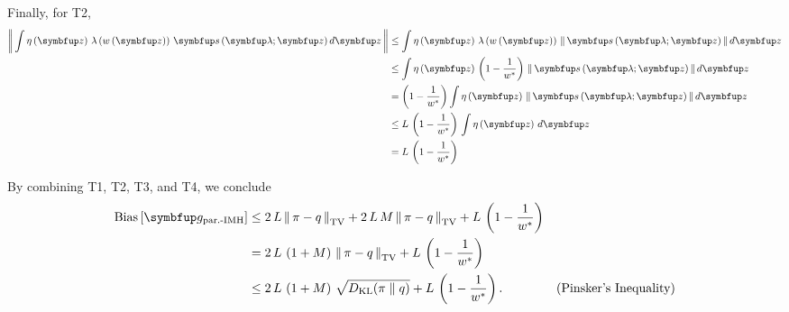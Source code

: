 \begin{proofEnd}
  Finally, for T2,
  \begin{align}
    \norm{
      \int \eta\left(\vz\right) \,
      \lambda\left(w\left(\vz\right)\right) \, \vs\left(\vlambda;\vz\right)
      d\vz
    }
    &\leq
    \int
    \eta\left(\vz\right) \,
    \lambda\left(w\left(\vz\right)\right) \,
    \norm{
      \vs\left(\vlambda;\vz\right)
    }\,
    d\vz
    \\
    &\leq
    \int
    \eta\left(\vz\right) \,
    \left(1 - \frac{1}{w^*}\right) \,
    \norm{
      \vs\left(\vlambda;\vz\right)
    }\,
    d\vz
    \\
    &=
    \left(1 - \frac{1}{w^*}\right)
    \int
    \eta\left(\vz\right)
    \,
    \norm{
      \vs\left(\vlambda;\vz\right)
    }\,
    d\vz
    \\
    &\leq
    L
    \,
    \left(1 - \frac{1}{w^*}\right)
    \,
    \int
    \eta\left(\vz\right)
    \, d\vz
    \\
    &=
    L
    \,
    \left(1 - \frac{1}{w^*}\right)
  \end{align}

  By combining T1, T2, T3, and T4, we conclude
  \begin{align}
    \mathrm{Bias}\left[ \vg_{\text{par.-IMH}} \right]
    &\leq
    2 \, L \, \DTV{\pi}{q} + 2 \, L \, M \, \DTV{\pi}{q} + L \, \left(1 - \frac{1}{w^*}\right)
    \\
    &=
    2 \, L \, \left( 1 + M \right) \, \DTV{\pi}{q} + L \, \left(1 - \frac{1}{w^*}\right)
    \\
    &\leq
    2 \, L \, \left( 1 + M \right) \, \sqrt{\DKL{\pi}{q}} + L \, \left(1 - \frac{1}{w^*}\right).
    &\text{(Pinsker's Inequality)}
  \end{align}
\end{proofEnd}

